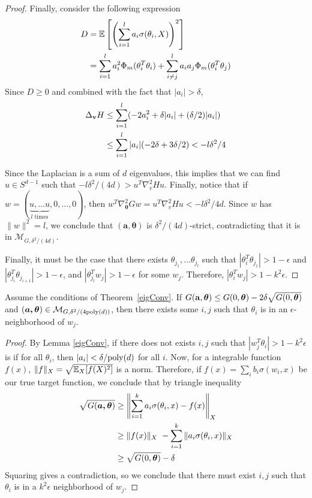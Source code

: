 \begin{proof}
Finally, consider the following expression
%
\begin{align*}
D & = \expt\left[\left( \sum_{i=1}^l a_i \sigma(\theta_i,X)\right)^2\right] \\
%
& =\sum_{i=1}^l a_i^2\Phi_m(\theta_i^T\theta_i) + \sum_{i \neq j}^l
  a_ia_j\Phi_m(\theta_i^T\theta_j)
\end{align*}
%
Since $D \geq 0$ and combined with the fact that $|a_i| > \delta$,
%
\begin{align*}
\Delta_{{\bf v}}H & \leq  \sum_{i=1}^l (-2a_i^2 +\delta |a_i|+(\delta/2)|a_i|) \\
& \leq   \sum_{i=1}^l  |a_i|(-2\delta + 3\delta/2) < -l\delta^2/4
\end{align*}

Since the Laplacian is a sum of $d$ eigenvalues, this implies that we can find $u \in S^{d-1}$ such that $-l\delta^2/(4d) > u^T\nabla^2_v H u$. Finally, notice that if $w = (\underbrace{u,...u}_{l {\textrm{ times}}},0,...,0)$, then $w^T\nabla^2_{\boldsymbol{\theta}} G w = u^T\nabla^2_v H u < -l\delta^2/4d$. Since $w$ has $\|w\|^2 = l$, we conclude that $(\boldsymbol{a,\theta})$ is $\delta^2/(4d)$-strict, contradicting that it is in $\mathcal{M}_{G, \delta^2/(4d)}$. 

Finally, it must be the case that there exists $\theta_{j_1},...\theta_{j_l}$ such that
$|\theta_i^T\theta_{j_1}| > 1-\epsilon$ and
$|\theta_{j_{i}}^T\theta_{j_{i+1}}| > 1-\epsilon$, and
$|\theta_{j_l}^Tw_j| > 1-\epsilon$ for some $w_j$. Therefore,
$|\theta_i^Tw_j| > 1- k^2\epsilon$. 
\end{proof}

\begin{theorem}\label{eigRes}
  Assume the conditions of Theorem~\ref{eigConv}. If
$G({\bf a, \boldsymbol{\theta}}) \leq G(0,\boldsymbol{\theta}) - 2\delta\sqrt{G(0,\boldsymbol{\theta})}$
  and $(\boldsymbol{a,\theta}) \in \mathcal{M}_{G,\delta^2/(4\mathrm{poly}(d))}$,
  then there exists some $i, j$ such that $\theta_i$ is in an
  $\epsilon$-neighborhood of $w_j$.
\end{theorem}
 
 \begin{proof}
   By Lemma \ref{eigConv}, if there does not exists $i, j$ such that
   $|w_j^T\theta_i| > 1-k^2\epsilon$ is if for all $\theta_i$, then
   $|a_i| < \delta/\mathrm{poly}(d)$ for all $i$. Now, for a integrable
   function $f(x)$, $\| f\|_X = \sqrt{\operatorname*{\mathbb{E}}_X[f(X)^2]}$ is a
   norm. Therefore, if $f(x) = \sum_i b_i \sigma(w_i,x)$ be our true
   target function, we conclude that by triangle inequality
\begin{align*}
\sqrt{G(\boldsymbol{a,\theta})}  & \geq \left\lVert \sum_{i=1}^k a_i \sigma(\theta_i,x) - f(x) \right\rVert_X \\
&\geq \|f(x)\|_X\ - \sum_{i=1}^k \|a_i\sigma(\theta_i,x) \|_X \\
& \geq
  \sqrt{G(0,\boldsymbol{\theta})} - \delta
\end{align*}
Squaring gives a contradiction, so we conclude that there must exist $i, j$ such that $\theta_i$ is in a $k^2\epsilon$ neighborhood of $w_j$.
 \end{proof}
 
